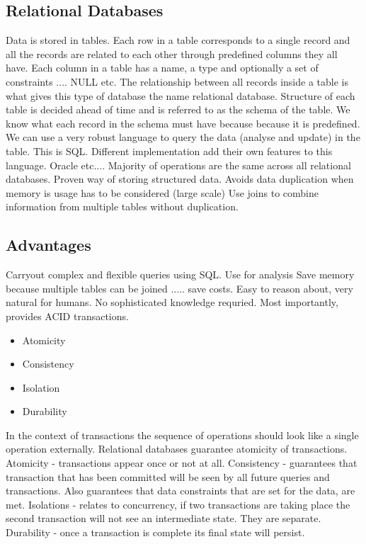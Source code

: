 \documentclass[a4paper, 11pt]{book}
\begin{document}
    \subsection{Relational Databases}
    Data is stored in tables.
    Each row in a table corresponds to a single record and all the records are related to each other through predefined columns they all have.
    Each column in a table has a name, a type and optionally a set of constraints .... NULL etc.
    The relationship between all records inside a table is what gives this type of database the name relational database.
    Structure of each table is decided ahead of time and is referred to as the schema of the table.
    We know what each record in the schema must have because because it is predefined.
    We can use a very robust language to query the data (analyse and update) in the table.
    This is SQL.
    Different implementation add their own features to this language.
    Oracle etc....
    Majority of operations are the same across all relational databases.
    Proven way of storing structured data.
    Avoids data duplication when memory is usage has to be considered (large scale)
    Use joins to combine information from multiple tables without duplication.

    \subsection{Advantages}
    Carryout complex and flexible queries using SQL. Use for analysis
    Save memory because multiple tables can be joined ..... save costs.
    Easy to reason about, very natural for humans.
    No sophisticated knowledge requried.
    Most importantly, provides ACID transactions.

    \begin{itemize}
        \item Atomicity
        \item Consistency
        \item Isolation
        \item Durability
    \end{itemize}

    In the context of transactions the sequence of operations should look like a single operation externally.
    Relational databases guarantee atomicity of transactions.
    Atomicity - transactions appear once or not at all.
    Consistency - guarantees that transaction that has been committed will be seen by all future queries and transactions.
    Also guarantees that data constraints that are set for the data, are met.
    Isolations - relates to concurrency, if two transactions are taking place the second transaction will not see an intermediate state. They are separate.
    Durability - once a transaction is complete its final state will persist.
\end{document}

